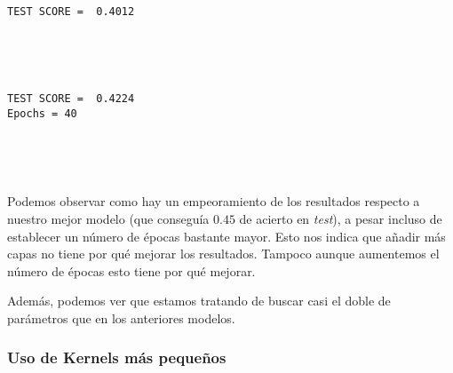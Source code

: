 \documentclass[11pt]{article}
\begin{document}
    \begin{Verbatim}[commandchars=\\\{\}]
TEST SCORE =  0.4012
    \end{Verbatim}

    \begin{center}
    \end{center}
    { \hspace*{\fill} \\}
    
    \begin{center}
    \end{center}
    { \hspace*{\fill} \\}
    
    \begin{Verbatim}[commandchars=\\\{\}]
TEST SCORE =  0.4224
Epochs = 40
    \end{Verbatim}

    \begin{center}
    \end{center}
    { \hspace*{\fill} \\}
    
    \begin{center}
    \end{center}
    { \hspace*{\fill} \\}
    
    Podemos observar como hay un empeoramiento de los resultados respecto a
nuestro mejor modelo (que conseguía \(0.45\) de acierto en \emph{test}),
a pesar incluso de establecer un número de épocas bastante mayor. Esto
nos indica que añadir más capas no tiene por qué mejorar los resultados.
Tampoco aunque aumentemos el número de épocas esto tiene por qué
mejorar.

Además, podemos ver que estamos tratando de buscar casi el doble de
parámetros que en los anteriores modelos.

    \hypertarget{uso-de-kernels-muxe1s-pequeuxf1os}{%
\subsubsection{Uso de Kernels más
pequeños}\label{uso-de-kernels-muxe1s-pequeuxf1os}}
\end{document}
